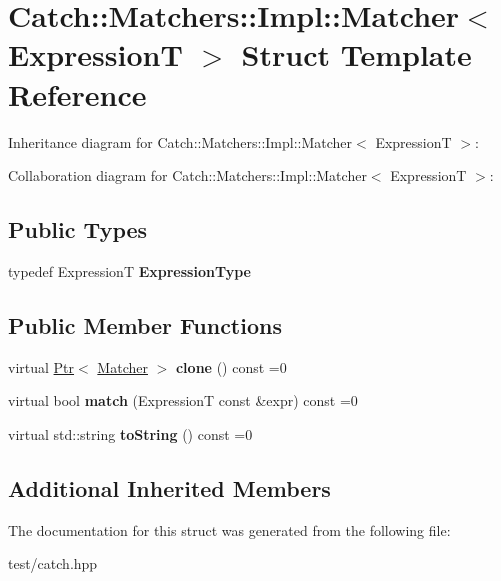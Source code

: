 \hypertarget{structCatch_1_1Matchers_1_1Impl_1_1Matcher}{}\section{Catch\+:\+:Matchers\+:\+:Impl\+:\+:Matcher$<$ ExpressionT $>$ Struct Template Reference}
\label{structCatch_1_1Matchers_1_1Impl_1_1Matcher}


Inheritance diagram for Catch\+:\+:Matchers\+:\+:Impl\+:\+:Matcher$<$ ExpressionT $>$\+:


Collaboration diagram for Catch\+:\+:Matchers\+:\+:Impl\+:\+:Matcher$<$ ExpressionT $>$\+:
\subsection*{Public Types}
\begin{DoxyCompactItemize}
\item 
typedef ExpressionT {\bfseries Expression\+Type}\hypertarget{structCatch_1_1Matchers_1_1Impl_1_1Matcher_a7f5068cbacd1eed06cf243e63446e7e1}{}\label{structCatch_1_1Matchers_1_1Impl_1_1Matcher_a7f5068cbacd1eed06cf243e63446e7e1}

\end{DoxyCompactItemize}
\subsection*{Public Member Functions}
\begin{DoxyCompactItemize}
\item 
virtual \hyperlink{classCatch_1_1Ptr}{Ptr}$<$ \hyperlink{structCatch_1_1Matchers_1_1Impl_1_1Matcher}{Matcher} $>$ {\bfseries clone} () const =0\hypertarget{structCatch_1_1Matchers_1_1Impl_1_1Matcher_a9d31e5018fea24efa08c3cbf5aa4475d}{}\label{structCatch_1_1Matchers_1_1Impl_1_1Matcher_a9d31e5018fea24efa08c3cbf5aa4475d}

\item 
virtual bool {\bfseries match} (ExpressionT const \&expr) const =0\hypertarget{structCatch_1_1Matchers_1_1Impl_1_1Matcher_a8c1c5511ce1f3738a45e6901b558f583}{}\label{structCatch_1_1Matchers_1_1Impl_1_1Matcher_a8c1c5511ce1f3738a45e6901b558f583}

\item 
virtual std\+::string {\bfseries to\+String} () const =0\hypertarget{structCatch_1_1Matchers_1_1Impl_1_1Matcher_a091bcc37e589967d7e10fc7790d820e2}{}\label{structCatch_1_1Matchers_1_1Impl_1_1Matcher_a091bcc37e589967d7e10fc7790d820e2}

\end{DoxyCompactItemize}
\subsection*{Additional Inherited Members}


The documentation for this struct was generated from the following file\+:\begin{DoxyCompactItemize}
\item 
test/catch.\+hpp\end{DoxyCompactItemize}
